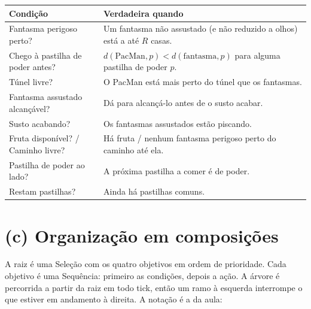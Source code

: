 \documentclass[11pt,a4paper]{article}
\begin{document}
\begin{center}\small
\begin{tabularx}{\textwidth}{@{}>{\raggedright}p{5.4cm}X@{}}
\toprule
Condição & Verdadeira quando \\
\midrule
Fantasma perigoso perto? & Um fantasma não assustado (e não reduzido a
  olhos) está a até $R$ casas. \\
Chego à pastilha de poder antes? & $d(\text{PacMan}, p) <
  d(\text{fantasma}, p)$ para alguma pastilha de poder $p$. \\
Túnel livre? & O PacMan está mais perto do túnel que os fantasmas. \\
Fantasma assustado alcançável? & Dá para alcançá-lo antes de o susto acabar. \\
Susto acabando? & Os fantasmas assustados estão piscando. \\
Fruta disponível? / Caminho livre? & Há fruta / nenhum fantasma perigoso
  perto do caminho até ela. \\
Pastilha de poder ao lado? & A próxima pastilha a comer é de poder. \\
Restam pastilhas? & Ainda há pastilhas comuns. \\
\bottomrule
\end{tabularx}
\end{center}

\section{(c) Organização em composições}

A raiz é uma Seleção com os quatro objetivos em ordem de prioridade. Cada
objetivo é uma Sequência: primeiro as condições, depois a ação. A árvore é
percorrida a partir da raiz em todo tick, então um ramo à esquerda interrompe
o que estiver em andamento à direita. A notação é a da aula:

\begin{center}
\end{center}
\end{document}

